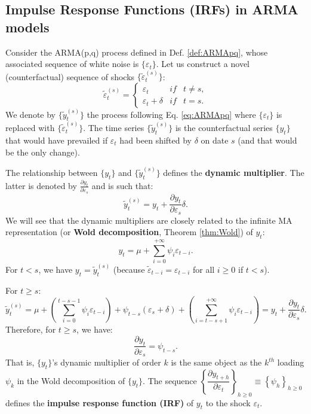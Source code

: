 \documentclass[
  12pt,
]{book}
\theoremstyle{definition}
\theoremstyle{definition}
\theoremstyle{definition}
\theoremstyle{definition}
\theoremstyle{remark}
\begin{document}
\hypertarget{impulse-response-functions-irfs-in-arma-models}{%
\subsection{Impulse Response Functions (IRFs) in ARMA models}\label{impulse-response-functions-irfs-in-arma-models}}

Consider the ARMA(p,q) process defined in Def. \ref{def:ARMApq}, whose associated sequence of white noise is \(\{\varepsilon_t\}\). Let us construct a novel (counterfactual) sequence of shocks \(\{\tilde\varepsilon_t^{(s)}\}\):
\[
\tilde\varepsilon_t^{(s)} = \left\{
\begin{array}{lcc}
\varepsilon_{t} & if & t \ne s,\\
\varepsilon_{t} + \delta &if& t=s.
\end{array}
\right.
\]
We denote by \(\{\tilde{y}_t^{(s)}\}\) the process following Eq. \eqref{eq:ARMApq} where \(\{\varepsilon_t\}\) is replaced with \(\{\tilde\varepsilon_t^{(s)}\}\). The time series \(\{\tilde{y}_t^{(s)}\}\) is the counterfactual series \(\{y_t\}\) that would have prevailed if \(\varepsilon_t\) had been shifted by \(\delta\) on date \(s\) (and that would be the only change).

The relationship between \(\{y_t\}\) and \(\{\tilde{y}_t^{(s)}\}\) defines the \textbf{dynamic multiplier}. The latter is denoted by \(\frac{\partial y_t}{\partial \varepsilon_{s}}\) and is such that:
\[
\tilde{y}_t^{(s)} = y_t + \frac{\partial y_t}{\partial \varepsilon_{s}}\delta.
\]
We will see that the dynamic multipliers are closely related to the infinite MA representation (or \textbf{Wold decomposition}, Theorem \ref{thm:Wold}) of \(y_t\):
\[
y_t = \mu + \sum_{i=0}^{+\infty} \psi_i \varepsilon_{t-i}.
\]
For \(t<s\), we have \(y_t = \tilde{y}_t^{(s)}\) (because \(\tilde{\varepsilon}_{t-i}= \varepsilon_{t-i}\) for all \(i \ge 0\) if \(t<s\)).

For \(t \ge s\):
\[
\tilde{y}_t^{(s)} = \mu + \left( \sum_{i=0}^{t-s-1} \psi_i \varepsilon_{t-i} \right) + \psi_{t-s}(\varepsilon_{s}+\delta) + \left( \sum_{i=t-s+1}^{+\infty} \psi_i \varepsilon_{t-i} \right)=y_t + \frac{\partial y_t}{\partial \varepsilon_{s}}\delta.
\]
Therefore, for \(t \ge s\), we have:
\[
\boxed{\dfrac{\partial y_t}{\partial \varepsilon_{s}}=\psi_{t-s}.}
\]
That is, \(\{y_t\}\)'s dynamic multiplier of order \(k\) is the same object as the \(k^{th}\) loading \(\psi_k\) in the Wold decomposition of \(\{y_t\}\). The sequence \(\left\{\dfrac{\partial y_{t+h}}{\partial \varepsilon_{t}}\right\}_{h \ge 0} \equiv \left\{\psi_h\right\}_{h \ge 0}\) defines the \textbf{impulse response function (IRF)} of \(y_t\) to the shock \(\varepsilon_t\).
\end{document}
